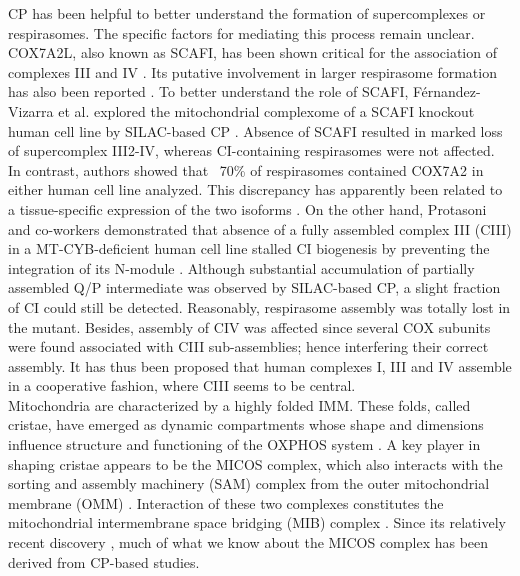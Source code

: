 CP has been helpful to better understand the formation of supercomplexes or respirasomes. The specific factors for mediating this process remain unclear. COX7A2L, also known as SCAFI, has been shown critical for the association of complexes III and IV \cite{Perez-Perez_2016}. Its putative involvement in larger respirasome formation has also been reported \cite{Lapuente-Brun_2013}. To better understand the role of SCAFI, Férnandez-Vizarra et al. explored the mitochondrial complexome of a SCAFI knockout human cell line by SILAC-based CP \cite{Fernández-Vizarra_2021}. Absence of SCAFI resulted in marked loss of supercomplex III2-IV, whereas CI-containing respirasomes were not affected. In contrast, authors showed that ~70\% of respirasomes contained COX7A2 in either human cell line analyzed. This discrepancy has apparently been related to a tissue-specific expression of the two isoforms \cite{Lapuente-Brun_2013}. On the other hand, Protasoni and co-workers demonstrated that absence of a fully assembled complex III (CIII) in a MT-CYB-deficient human cell line stalled CI biogenesis by preventing the integration of its N-module \cite{Protasoni_2020}. Although substantial accumulation of partially assembled Q/P intermediate was observed by SILAC-based CP, a slight fraction of CI could still be detected. Reasonably, respirasome assembly was totally lost in the mutant. Besides, assembly of CIV was affected since several COX subunits were found associated with CIII sub-assemblies; hence interfering their correct assembly. It has thus been proposed that human complexes I, III and IV assemble in a cooperative fashion, where CIII seems to be central.\\
Mitochondria are characterized by a highly folded IMM. These folds, called cristae, have emerged as dynamic compartments whose shape and dimensions influence structure and functioning of the OXPHOS system \cite{Cogliati_2016}. A key player in shaping cristae appears to be the MICOS complex, which also interacts with the sorting and assembly machinery (SAM) complex from the outer mitochondrial membrane (OMM) \cite{Huynen_2016}. Interaction of these two complexes constitutes the mitochondrial intermembrane space bridging (MIB) complex \cite{Ott_2015}. Since its relatively recent discovery \cite{Harner_2011}, much of what we know about the MICOS complex has been derived from CP-based studies.\\
